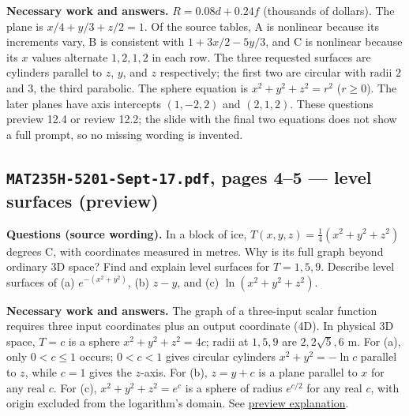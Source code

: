 \textbf{Necessary work and answers.} $R=0.08d+0.24f$ (thousands of dollars). The plane is $x/4+y/3+z/2=1$. Of the source tables, A is nonlinear because its increments vary, B is consistent with $1+3x/2-5y/3$, and C is nonlinear because its $x$ values alternate $1,2,1,2$ in each row. The three requested surfaces are cylinders parallel to $z$, $y$, and $z$ respectively; the first two are circular with radii $2$ and $3$, the third parabolic. The sphere equation is $x^2+y^2+z^2=r^2$ ($r\geq0$). The later planes have axis intercepts $(1,-2,2)$ and $(2,1,2)$. These questions preview 12.4 or review 12.2; the slide with the final two equations does not show a full prompt, so no missing wording is invented.

\subsection{\texttt{MAT235H-5201-Sept-17.pdf}, pages 4--5 --- level surfaces (preview)}
\textbf{Questions (source wording).} In a block of ice, $T(x,y,z)=\tfrac14(x^2+y^2+z^2)$ degrees C, with coordinates measured in metres. Why is its full graph beyond ordinary 3D space? Find and explain level surfaces for $T=1,5,9$. Describe level surfaces of (a) $e^{-(x^2+y^2)}$, (b) $z-y$, and (c) $\ln(x^2+y^2+z^2)$.\par
\textbf{Necessary work and answers.} The graph of a three-input scalar function requires three input coordinates plus an output coordinate (4D). In physical 3D space, $T=c$ is a sphere $x^2+y^2+z^2=4c$; radii at $1,5,9$ are $2,2\sqrt5,6$ m. For (a), only $0<c\leq1$ occurs; $0<c<1$ gives circular cylinders $x^2+y^2=-\ln c$ parallel to $z$, while $c=1$ gives the $z$-axis. For (b), $z=y+c$ is a plane parallel to $x$ for any real $c$. For (c), $x^2+y^2+z^2=e^c$ is a sphere of radius $e^{c/2}$ for any real $c$, with origin excluded from the logarithm's domain. See \hyperref[preview]{preview explanation}.
